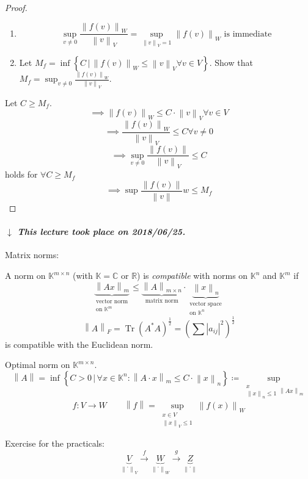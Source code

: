 \documentclass{article}
\numberwithin{lecref}{section}
\newcommand{\setdef}[2]{\left\{\left.#1\,\right|\,#2\right\}}
\newcommand{\norm}[1]{\left\|#1\right\|}
\newcommand{\card}[1]{\left|#1\right|}
\newcommand{\dateref}[1]{%
  \begin{mdframed}[backgroundcolor=gray!10,innerbottommargin=0pt,innertopmargin=0pt]
    \paragraph{\textit{$\downarrow$ This lecture took place on #1.}}%
  \end{mdframed}%
}
\begin{document}
\begin{proof}
  \begin{enumerate}
    \item \[ \sup_{v \neq 0} \frac{\norm{f(v)}_W}{\norm{v}_V} = \sup_{\norm{v}_V = 1} \norm{f(v)}_W \text{ is immediate} \]
    \item Let $M_f = \inf\setdef{C}{\norm{f(v)}_W \leq \norm{v}_V \forall v \in V}$. Show that $M_f = \sup_{v \neq 0} \frac{\norm{f(v)}_W}{\norm{v}_V}$.
  \end{enumerate}

  Let $C \geq M_f$.
  \[ \implies \norm{f(v)}_W \leq C \cdot \norm{v}_V \forall v \in V \]
  \[ \implies \frac{\norm{f(v)}_W}{\norm{v}_V} \leq C \forall v \neq 0 \]
  \[ \implies \sup_{v \neq 0} \frac{\norm{f(v)}}{\norm{v}_V} \leq C \]
  holds for $\forall C \geq M_f$
  \[ \implies \sup{\frac{\norm{f(v)}}{\norm{v}}} w \leq M_f \]
\end{proof}

\dateref{2018/06/25}

Matrix norms:

A norm on $\mathbb K^{m \times n}$ (with $\mathbb K = \mathbb C$ or $\mathbb R$) is \emph{compatible} with norms on $\mathbb K^n$ and $\mathbb K^m$ if
\[
  \underbrace{\norm{Ax}_m}_{\substack{\text{vector norm} \\ \text{on } \mathbb K^m}}
  \leq
  \underbrace{\norm{A}_{m \times n}}_{\text{matrix norm}} \cdot \underbrace{\norm{x}_n}_{\substack{\text{vector space} \\ \text{on } \mathbb K^n}}
\]
\[ \norm{A}_F = \operatorname{Tr}(A^* A)^{\frac12} = \left(\sum \card{a_{ij}}^2\right)^{\frac12} \]
is compatible with the Euclidean norm.

Optimal norm on $\mathbb K^{m \times n}$.
\[ \norm A = \inf\setdef{C > 0}{\forall x \in \mathbb K^n: \norm{A \cdot x}_m \leq C \cdot \norm{x}_n} \coloneqq \sup_{\substack{x \\ \norm{x}_n \leq 1} \norm{Ax}_m} \]
\[ f: V \to W \qquad \norm{f} = \sup_{\substack{x \in V \\ \norm{x}_V \leq 1}} \norm{f(x)}_W \]

Exercise for the practicals:
\[ \underbrace{V}_{\norm{\cdot}_V} \xrightarrow f \underbrace{W}_{\norm{\cdot}_W} \xrightarrow g \underbrace{Z}_{\norm{\cdot}} \]
\end{document}
